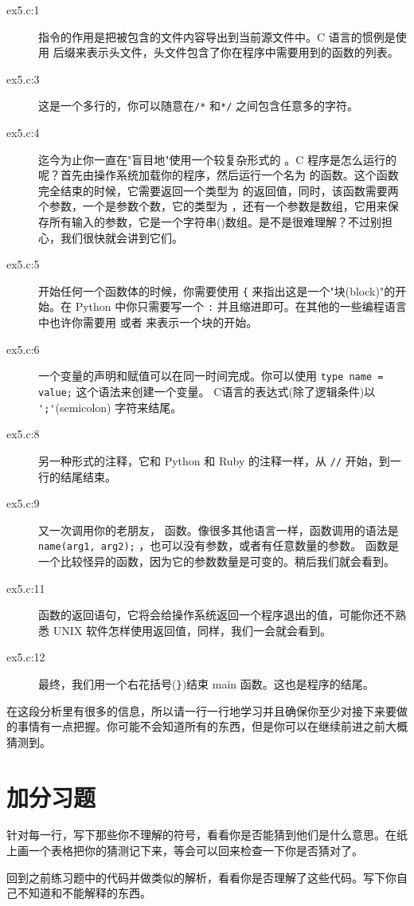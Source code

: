 \begin{description}
\item[ex5.c:1]  指令的作用是把被包含的文件内容导出到当前源文件中。C 语言的惯例是使用  后缀来表示头文件，头文件包含了你在程序中需要用到的函数的列表。
\item[ex5.c:3] 这是一个多行的，你可以随意在\verb|/*| 和\verb|*/| 之间包含任意多的字符。
\item[ex5.c:4] 迄今为止你一直在"盲目地"使用一个较复杂形式的 。C 程序是怎么运行的呢？首先由操作系统加载你的程序，然后运行一个名为  的函数。这个函数完全结束的时候，它需要返回一个类型为  的返回值，同时，该函数需要两个参数，一个是参数个数，它的类型为 ，还有一个参数是数组，它用来保存所有输入的参数，它是一个字符串()数组。是不是很难理解？不过别担心，我们很快就会讲到它们。
\item[ex5.c:5] 开始任何一个函数体的时候，你需要使用 \verb|{| 来指出这是一个"块(block)"的开始。在 Python 中你只需要写一个 \verb|:| 并且缩进即可。在其他的一些编程语言中也许你需要用  或者  来表示一个块的开始。
\item[ex5.c:6] 一个变量的声明和赋值可以在同一时间完成。你可以使用 \verb|type name = value;| 这个语法来创建一个变量。
    C语言的表达式(除了逻辑条件)以 \verb|';'|(semicolon) 字符来结尾。
\item[ex5.c:8] 另一种形式的注释，它和 Python 和 Ruby 的注释一样，从 \verb|//| 开始，到一行的结尾结束。
\item[ex5.c:9] 又一次调用你的老朋友， 函数。像很多其他语言一样，函数调用的语法是 \verb|name(arg1, arg2);| ，也可以没有参数，或者有任意数量的参数。 函数是一个比较怪异的函数，因为它的参数数量是可变的。稍后我们就会看到。
\item[ex5.c:11] 函数的返回语句，它将会给操作系统返回一个程序退出的值，可能你还不熟悉 UNIX 软件怎样使用返回值，同样，我们一会就会看到。
\item[ex5.c:12] 最终，我们用一个右花括号(\verb|}|)结束 main 函数。这也是程序的结尾。
\end{description}

在这段分析里有很多的信息，所以请一行一行地学习并且确保你至少对接下来要做的事情有一点把握。你可能不会知道所有的东西，但是你可以在继续前进之前大概猜测到。

\section{加分习题}

\begin{enumrate}
\item 针对每一行，写下那些你不理解的符号，看看你是否能猜到他们是什么意思。在纸上画一个表格把你的猜测记下来，等会可以回来检查一下你是否猜对了。
\item 回到之前练习题中的代码并做类似的解析，看看你是否理解了这些代码。写下你自己不知道和不能解释的东西。
\end{enumrate}
